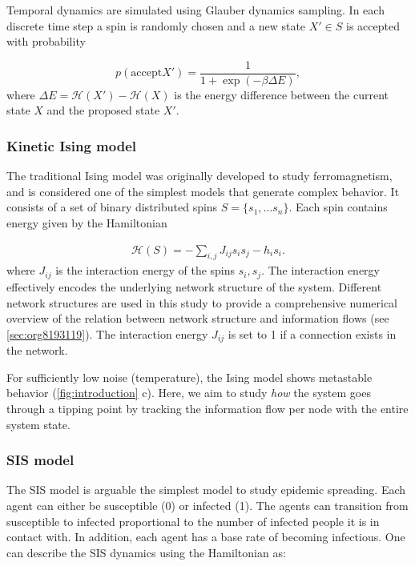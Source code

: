\documentclass[a4paper, 11pt, twocolumn]{article}
\begin{document}
Temporal  dynamics  are simulated  using Glauber dynamics
sampling.  In each  discrete time  step a  spin is  randomly
chosen and a new state $X'\in S$ is accepted with probability

\begin{equation}
\label{eq:glauber}
p( \text{accept} X' ) = \frac{1}{1 + \exp(-\beta \Delta E)},
\end{equation}
where $\Delta E = \mathcal{H}(X') -  \mathcal{H}(X)$ is the energy difference between
the current state $X$ and the proposed state $X'$.


\subsubsection{Kinetic Ising model}
\label{sec:orgb324012}
The  traditional Ising  model  was  originally developed  to
study ferromagnetism, and is  considered one of the simplest
models that generate complex behavior.  It consists of a set
of binary distributed  spins $S = \{s_1,  \dots s_n\}$. Each
spin contains energy given by the Hamiltonian

\begin{equation}
\label{eq:energy}
\begin{split}
    \mathcal{H}(S) = -\sum_{i,j} J_{ij} s_{i} s_{j} - h_{i} s_{i}.
\end{split}
\end{equation}
where $J_{ij}$ is the interaction  energy of the spins $s_i,
s_j$.  The   interaction  energy  effectively   encodes  the
underlying  network  structure   of  the  system.  Different
network  structures are  used  in this  study  to provide  a
comprehensive  numerical overview  of  the relation  between
network  structure and  information flows  (see \ref{sec:org8193119}). The interaction energy  $J_{ij}$ is set to 1
if a connection exists in the network.


For sufficiently  low noise  (temperature), the  Ising model
shows metastable behavior (\cref{fig:introduction} c). Here,
we  aim to  study \emph{how}  the system  goes through  a tipping
point by  tracking the  information flow  per node  with the
entire system state.

\subsubsection{SIS model}
\label{sec:orgddc3122}
The  SIS  model is  arguable  the  simplest model  to  study
epidemic spreading. Each agent can either be susceptible (0)
or infected (1). The  agents can transition from susceptible
to infected proportional to the number of infected people it
is in contact with. In addition,  each agent has a base rate
of becoming  infectious. One  can describe the  SIS dynamics
using the Hamiltonian as:
\end{document}
